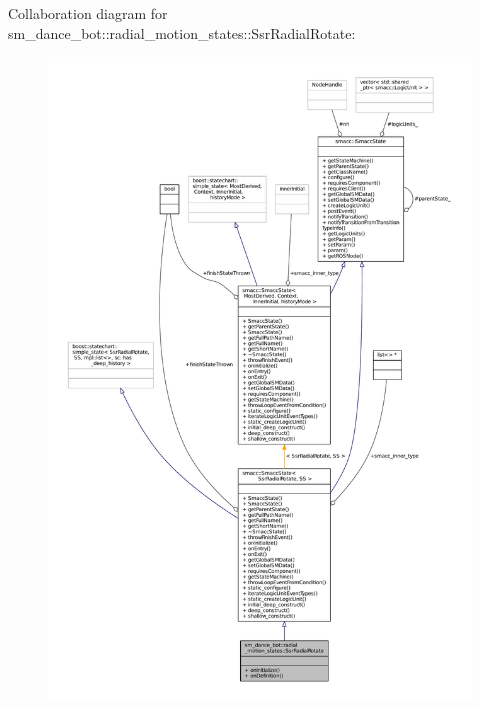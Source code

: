 Collaboration diagram for sm\+\_\+dance\+\_\+bot\+:\+:radial\+\_\+motion\+\_\+states\+:\+:Ssr\+Radial\+Rotate\+:
\nopagebreak
\begin{figure}[H]
\begin{center}
\leavevmode
\includegraphics[width=350pt]{structsm__dance__bot_1_1radial__motion__states_1_1SsrRadialRotate__coll__graph}
\end{center}
\end{figure}
